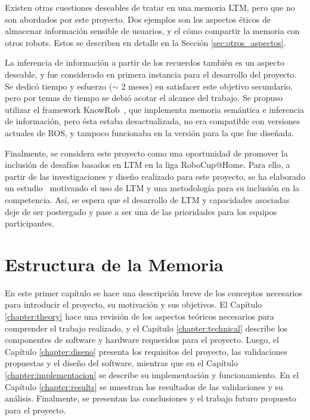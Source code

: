 Existen otras cuestiones deseables de tratar en una memoria LTM, pero que no son abordados por este proyecto. Dos ejemplos son los aspectos éticos de almacenar información sensible de usuarios, y el cómo compartir la memoria con otros robots. Estos se describen en detalle en la Sección \ref{sec:otros_aspectos}.

La inferencia de información a partir de los recuerdos también es un aspecto deseable, y fue considerado en primera instancia para el desarrollo del proyecto. Se dedicó tiempo y esfuerzo ($\sim$ 2 meses) en satisfacer este objetivo secundario, pero por temas de tiempo se debió acotar el alcance del trabajo. Se propuso utilizar el framework KnowRob~\cite{Tenorth2009,Tenorth2013,Winkler2014}, que implementa memoria semántica e inferencia de información, pero ésta estaba desactualizada, no era compatible con versiones actuales de ROS, y tampoco funcionaba en la versión para la que fue diseñada.

Finalmente, se considera este proyecto como una oportunidad de promover la inclusión de desafíos basados en LTM en la liga RoboCup@Home. Para ello, a partir de las investigaciones y diseño realizado para este proyecto, se ha elaborado un estudio~\cite{ltm_in_robocup} motivando el uso de LTM y una metodología para su inclusión en la competencia. Así, se espera que el desarrollo de LTM y capacidades asociadas deje de ser postergado y pase a ser una de las prioridades para los equipos participantes.



\section{Estructura de la Memoria}

En este primer capítulo se hace una descripción breve de los conceptos necesarios para introducir el proyecto, su motivación y sus objetivos. El Capítulo \ref{chapter:theory} hace una revisión de los aspectos teóricos necesarios para comprender el trabajo realizado, y el Capítulo \ref{chapter:technical} describe los componentes de software y hardware requeridos para el proyecto. Luego, el Capítulo \ref{chapter:diseno} presenta los requisitos del proyecto, las validaciones propuestas y el diseño del software, mientras que en el Capítulo \ref{chapter:implementacion} se describe su implementación y funcionamiento. En el Capítulo \ref{chapter:results} se muestran los resultados de las validaciones y su análisis. Finalmente, se presentan las conclusiones y el trabajo futuro propuesto para el proyecto.

